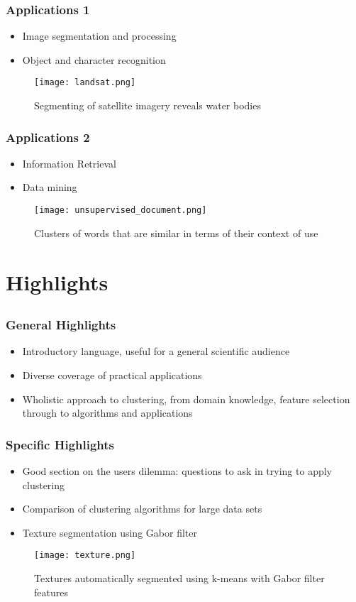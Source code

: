 \documentclass{beamer}
\begin{document}
        \frame
        {
            \frametitle{Applications 1}
			\begin{itemize}
				\item Image segmentation and processing
				\item Object and character recognition
			\end{itemize}

			\begin{figure}
				\texttt{[image: landsat.png]}
				\caption{Segmenting of satellite imagery reveals water bodies}
			\end{figure}
		}

		\frame
		{
			\frametitle{Applications 2}
			\begin{itemize}
				\item Information Retrieval
				\item Data mining
			\end{itemize}
			\begin{figure}
				\texttt{[image: unsupervised\_document.png]}
				\caption{Clusters of words that are similar in terms of their context of use}
			\end{figure}
		}

\section{Highlights}
    \subsection{}
        \frame
        {
			\frametitle{General Highlights}
			\begin{itemize}
				\item Introductory language, useful for a general scientific audience
				\item Diverse coverage of practical applications
				\item Wholistic approach to clustering, from domain knowledge, feature selection through to algorithms and applications
			\end{itemize}
        }   

        \frame
        {
	        \frametitle{Specific Highlights}
			\begin{itemize}
				\item Good section on the users dilemma: questions to ask in trying to apply clustering
				\item Comparison of clustering algorithms for large data sets
				\item Texture segmentation using Gabor filter
			\end{itemize}
			\begin{figure}
				\texttt{[image: texture.png]}
				\caption{Textures automatically segmented using k-means with Gabor filter features}
			\end{figure}
		}
\end{document}
